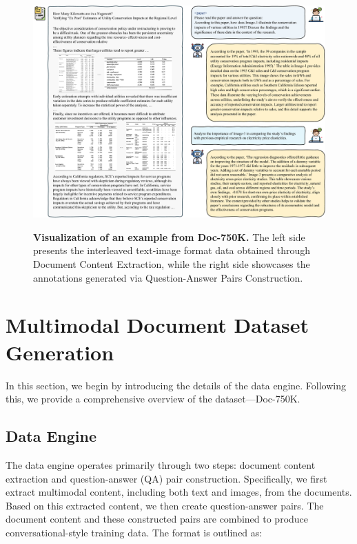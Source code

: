 \documentclass[10pt,twocolumn,letterpaper]{article}
\def\dataname{Doc-750K\xspace}
\begin{document}
\begin{CJK}{UTF8}{gbsn}
\begin{figure}[t!]
    \centering
    {\includegraphics[width=\linewidth]{figure/example.pdf}}
    \caption{\textbf{Visualization of an example from {\dataname}.} The left side presents the interleaved text-image format data obtained through Document Content Extraction, while the right side showcases the annotations generated via Question-Answer Pairs Construction.}
    \label{fig:data_example}
    \vspace{-3mm}
\end{figure}


\section{Multimodal Document Dataset Generation}

In this section, we begin by introducing the details of the data engine.
Following this, we provide a comprehensive overview of the dataset---\dataname.

\newcommand\hys[1]{\textcolor{red}{#1}}
\subsection{Data Engine} 
\label{sec:data_engine}
The data engine operates primarily through two steps: document content extraction and question-answer (QA) pair construction.
Specifically, we first extract multimodal content, including both text and images, from the documents. Based on this extracted content, we then create question-answer pairs. The document content and these constructed pairs are combined to produce conversational-style training data. The format is outlined as: 



\end{CJK}
\end{document}
